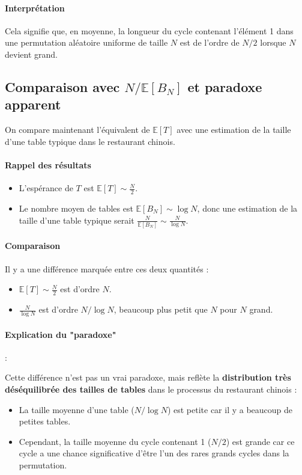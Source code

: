 \documentclass[12pt, a4paper]{article}
\theoremstyle{definition}
\theoremstyle{plain}
\begin{document}
\paragraph{Interprétation}
Cela signifie que, en moyenne, la longueur du cycle contenant l'élément 1 dans une permutation aléatoire uniforme de taille \(N\) est de l'ordre de \(N/2\) lorsque \(N\) devient grand.

\subsection{Comparaison avec \(N/\mathbb{E}[B_N]\) et paradoxe apparent}

On compare maintenant l'équivalent de \(\mathbb{E}[T]\) avec une estimation de la taille d'une table typique dans le restaurant chinois.

\paragraph{Rappel des résultats}
\begin{itemize}
    \item L'espérance de \(T\) est \(\mathbb{E}[T] \sim \frac{N}{2}\).
    \item Le nombre moyen de tables est \(\mathbb{E}[B_N] \sim \log N\), donc une estimation de la taille d'une table typique serait \(\frac{N}{\mathbb{E}[B_N]} \sim \frac{N}{\log N}\).
\end{itemize}

\paragraph{Comparaison}
Il y a une différence marquée entre ces deux quantités :
\begin{itemize}
    \item \(\mathbb{E}[T] \sim \frac{N}{2}\) est d'ordre \(N\).
    \item \(\frac{N}{\log N}\) est d'ordre \(N/\log N\), beaucoup plus petit que \(N\) pour \(N\) grand.
\end{itemize}

\paragraph{Explication du "paradoxe"} :

Cette différence n'est pas un vrai paradoxe, mais reflète la \textbf{distribution très déséquilibrée des tailles de tables} dans le processus du restaurant chinois :
\begin{itemize}
    \item La taille moyenne d'une table (\(N/\log N\)) est petite car il y a beaucoup de petites tables.
    \item Cependant, la taille moyenne du cycle contenant 1 (\(N/2\)) est grande car ce cycle a une chance significative d'être l'un des rares grands cycles dans la permutation.
\end{itemize}
\end{document}
